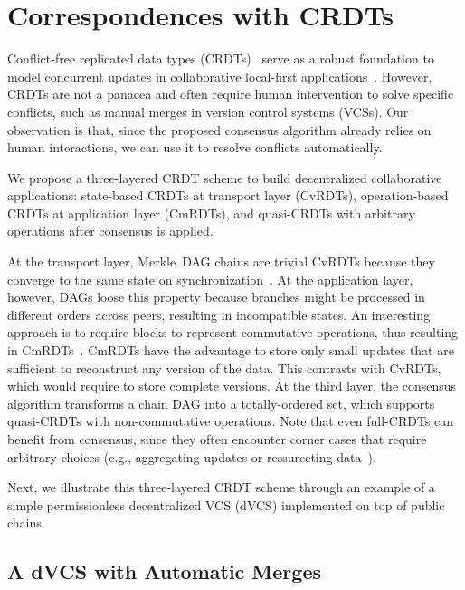 \documentclass[10pt,journal,compsoc]{IEEEtran}
\begin{document}
\section{Correspondences with CRDTs}
\label{sec.crdts}

Conflict-free replicated data types (CRDTs)~\cite{p2p.crdts} serve as a robust
foundation to model concurrent updates in collaborative local-first
applications~\cite{p2p.local}.
However, CRDTs are not a panacea and often require human intervention to solve
specific conflicts, such as manual merges in version control systems (VCSs).
%
Our observation is that, since the proposed consensus algorithm already relies
on human interactions, we can use it to resolve conflicts automatically.

We propose a three-layered CRDT scheme to build decentralized collaborative
applications:
    state-based CRDTs at transport layer (CvRDTs),
    operation-based CRDTs at application layer (CmRDTs), and
    quasi-CRDTs with arbitrary operations after consensus is applied.

At the transport layer, Merkle~DAG chains are trivial CvRDTs because they
converge to the same state on synchronization~\cite{p2p.merkle-crdts}.
%
At the application layer, however, DAGs loose this property because branches
might be processed in different orders across peers, resulting in incompatible
states.
An interesting approach is to require blocks to represent commutative
operations, thus resulting in CmRDTs~\cite{p2p.merkle-crdts}.
%
CmRDTs have the advantage to store only small updates that are sufficient to
reconstruct any version of the data.
This contrasts with CvRDTs, which would require to store complete versions.
%
At the third layer, the consensus algorithm transforms a chain DAG into a
totally-ordered set, which supports quasi-CRDTs with non-commutative
operations.
Note that even full-CRDTs can benefit from consensus, since they often
encounter corner cases that require arbitrary choices (e.g., aggregating
updates or ressurecting data~\cite{p2p.automerge}).

Next, we illustrate this three-layered CRDT scheme through an example of a
simple permissionless decentralized VCS (dVCS) implemented on top of public
chains.

\subsection{A dVCS with Automatic Merges}
\end{document}
